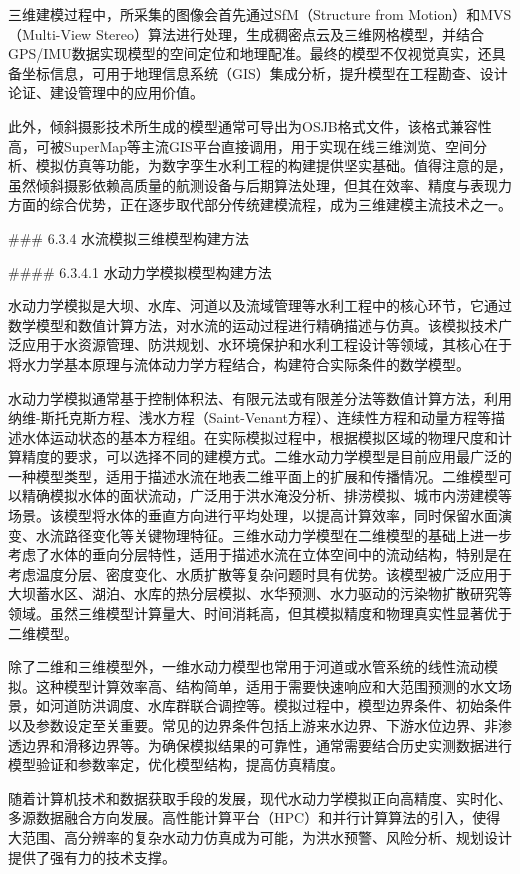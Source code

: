 三维建模过程中，所采集的图像会首先通过SfM（Structure from Motion）和MVS（Multi-View Stereo）算法进行处理，生成稠密点云及三维网格模型，并结合GPS/IMU数据实现模型的空间定位和地理配准。最终的模型不仅视觉真实，还具备坐标信息，可用于地理信息系统（GIS）集成分析，提升模型在工程勘查、设计论证、建设管理中的应用价值。

此外，倾斜摄影技术所生成的模型通常可导出为OSJB格式文件，该格式兼容性高，可被SuperMap等主流GIS平台直接调用，用于实现在线三维浏览、空间分析、模拟仿真等功能，为数字孪生水利工程的构建提供坚实基础。值得注意的是，虽然倾斜摄影依赖高质量的航测设备与后期算法处理，但其在效率、精度与表现力方面的综合优势，正在逐步取代部分传统建模流程，成为三维建模主流技术之一。

\#\#\# 6.3.4 水流模拟三维模型构建方法

\#\#\#\# 6.3.4.1 水动力学模拟模型构建方法

水动力学模拟是大坝、水库、河道以及流域管理等水利工程中的核心环节，它通过数学模型和数值计算方法，对水流的运动过程进行精确描述与仿真。该模拟技术广泛应用于水资源管理、防洪规划、水环境保护和水利工程设计等领域，其核心在于将水力学基本原理与流体动力学方程结合，构建符合实际条件的数学模型。

水动力学模拟通常基于控制体积法、有限元法或有限差分法等数值计算方法，利用纳维-斯托克斯方程、浅水方程（Saint-Venant方程）、连续性方程和动量方程等描述水体运动状态的基本方程组。在实际模拟过程中，根据模拟区域的物理尺度和计算精度的要求，可以选择不同的建模方式。二维水动力学模型是目前应用最广泛的一种模型类型，适用于描述水流在地表二维平面上的扩展和传播情况。二维模型可以精确模拟水体的面状流动，广泛用于洪水淹没分析、排涝模拟、城市内涝建模等场景。该模型将水体的垂直方向进行平均处理，以提高计算效率，同时保留水面演变、水流路径变化等关键物理特征。三维水动力学模型在二维模型的基础上进一步考虑了水体的垂向分层特性，适用于描述水流在立体空间中的流动结构，特别是在考虑温度分层、密度变化、水质扩散等复杂问题时具有优势。该模型被广泛应用于大坝蓄水区、湖泊、水库的热分层模拟、水华预测、水力驱动的污染物扩散研究等领域。虽然三维模型计算量大、时间消耗高，但其模拟精度和物理真实性显著优于二维模型。

除了二维和三维模型外，一维水动力模型也常用于河道或水管系统的线性流动模拟。这种模型计算效率高、结构简单，适用于需要快速响应和大范围预测的水文场景，如河道防洪调度、水库群联合调控等。模拟过程中，模型边界条件、初始条件以及参数设定至关重要。常见的边界条件包括上游来水边界、下游水位边界、非渗透边界和滑移边界等。为确保模拟结果的可靠性，通常需要结合历史实测数据进行模型验证和参数率定，优化模型结构，提高仿真精度。

随着计算机技术和数据获取手段的发展，现代水动力学模拟正向高精度、实时化、多源数据融合方向发展。高性能计算平台（HPC）和并行计算算法的引入，使得大范围、高分辨率的复杂水动力仿真成为可能，为洪水预警、风险分析、规划设计提供了强有力的技术支撑。

